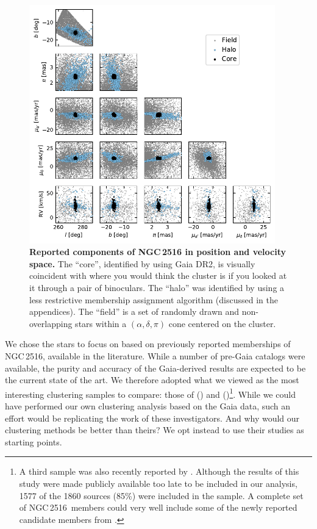 \documentclass[12pt,twocolumn,tighten]{aastex63}
\newcommand{\cn}{NGC\,2516} %
\begin{document}
\begin{figure}[t]
	\begin{center}
		\leavevmode
		\includegraphics[width=0.95\textwidth]{f1.pdf}
	\end{center}
	\vspace{-0.7cm}
	\caption{ {\bf Reported components of NGC\,2516 in position and
    velocity space.}
    The ``core'', identified by \citet{cantatgaudin_gaia_2018} using
    Gaia DR2, is visually coincident
    with where you would think the cluster is if you looked at it through a pair
    of binoculars.
    The ``halo'' was identified by \citet{kounkel_untangling_2019}
    using a less restrictive membership assignment algorithm (discussed
    in the appendices).
    The ``field'' is a set of randomly drawn and non-overlapping stars
    within a
    $(\alpha, \delta, \pi)$ cone centered on the cluster.
		\label{fig:gaia6d}
	}
\end{figure}

We chose the stars to focus on based on previously reported
memberships of NGC\,2516, available in the literature.  While a number
of pre-Gaia catalogs were available, the purity and accuracy of the
Gaia-derived results are expected to be the current state of the art.
We therefore adopted what we viewed as the most interesting clustering
samples to compare: those of \citet{cantatgaudin_gaia_2018}
() and
\citet{kounkel_untangling_2019}
()\footnote{A third sample was
also recently reported by \citet{meingast_2021}. Although the results
of this study were made publicly available too late to be included in
our analysis,  1577 of the 1860 \citet{meingast_2021} sources (85\%)
were included in the \citet{kounkel_untangling_2019} sample.  A
complete set of \cn\ members could very well include some of the newly
reported candidate members from \citet{meingast_2021}.}. While we
could have performed our own clustering analysis based on the Gaia
data, such an effort would be replicating the work of these
investigators. And why would our clustering methods be better than
theirs? We opt instead to use their studies as starting points.
\end{document}
